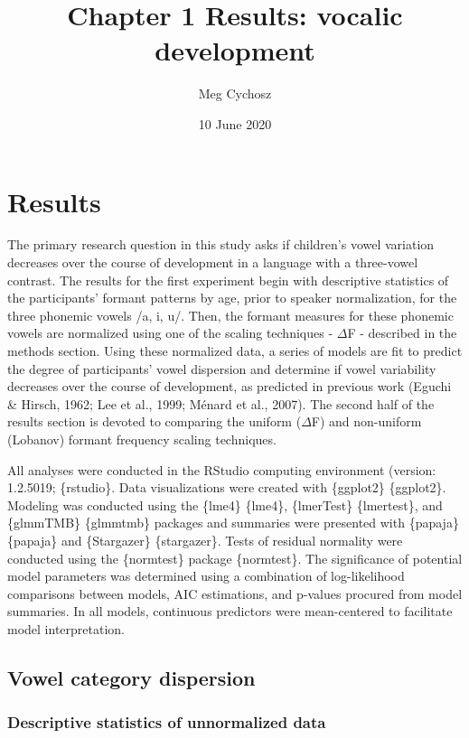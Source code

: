 \documentclass[
]{article}
\title{Chapter 1 Results: vocalic development}
\author{Meg Cychosz}
\date{10 June 2020}
\begin{document}
\maketitle

\hypertarget{results}{%
\section{Results}\label{results}}

The primary research question in this study asks if children's vowel variation decreases over the course of development in a language with a three-vowel contrast. The results for the first experiment begin with descriptive statistics of the participants' formant patterns by age, prior to speaker normalization, for the three phonemic vowels /a, i, u/. Then, the formant measures for these phonemic vowels are normalized using one of the scaling techniques - \(\Delta\)F - described in the methods section. Using these normalized data, a series of models are fit to predict the degree of participants' vowel dispersion and determine if vowel variability decreases over the course of development, as predicted in previous work (Eguchi \& Hirsch, 1962; Lee et al., 1999; Ménard et al., 2007). The second half of the results section is devoted to comparing the uniform (\(\Delta\)F) and non-uniform (Lobanov) formant frequency scaling techniques.

All analyses were conducted in the RStudio computing environment (version: 1.2.5019; \{rstudio\}. Data visualizations were created with \{ggplot2\} \{ggplot2\}. Modeling was conducted using the \{lme4\} \{lme4\}, \{lmerTest\} \{lmertest\}, and \{glmmTMB\} \{glmmtmb\} packages and summaries were presented with \{papaja\} \{papaja\} and \{Stargazer\} \{stargazer\}. Tests of residual normality were conducted using the \{normtest\} package \{normtest\}. The significance of potential model parameters was determined using a combination of log-likelihood comparisons between models, AIC estimations, and p-values procured from model summaries. In all models, continuous predictors were mean-centered to facilitate model interpretation.

\subsection{Vowel category dispersion}

\hypertarget{descriptive-statistics-of-unnormalized-data}{%
\subsubsection{Descriptive statistics of unnormalized data}\label{descriptive-statistics-of-unnormalized-data}}
\end{document}

